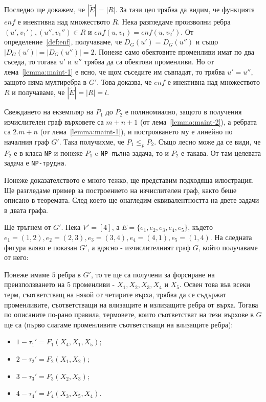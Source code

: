 \documentclass[12pt,twoside,a4paper]{article}
\begin{document}
\begin{theorem}
		Последно ще докажем, че $|\tilde{E}|=|R|$. За тази цел трябва да видим, че функцията $enf$ е инективна над множеството $R$. Нека разгледаме произволни ребра $(u',v_1'), (u'',v_1'') \in R$ и $enf(u,v_1)=enf(u,v_2')$. От определение~\ref{def:enf}, получаваме, че $D_G(u')=D_G(u'')$ и също $|D_G(u')|=|D_G(u'')|=2$. Понеже само обектовите променливи имат по два съседа, то тогава $u'$ и $u''$ трябва да са обектови променливи. Но от лема~\ref{lemma:maint-1} е ясно, че щом съседите им съвпадат, то трябва $u'=u''$, защото няма мултиребра в $G'$. Това доказва, че $enf$ е инективна над множеството $R$ и получаваме, че $|\tilde{E}|=|R|=l$.
		
		Свеждането на екземпляр на $P_1$ до $P_2$ е полиномиално, защото в получения изчислителен граф върховете са $m+n+1$ (от лема~\ref{lemma:maint-2}), а ребрата са $2.m+n$ (от лема~\ref{lemma:maint-1}), и построяването му е линейно по началния граф $G'$. Така получихме, че $P_1 \le_p P_2$. Също лесно може да се види, че $P_2$ е в класа \texttt{NP} и понеже $P_1$ e \texttt{NP-пълна} задача, то и $P_2$ е такава. От там целевата задача е \texttt{NP-трудна}.
	\end{theorem}
	
	\indent Понеже доказателството е много тежко, ще представим подходяща илюстрация. Ще разгледаме пример за построението на изчислителен граф, както беше описано в теоремата. След което ще онагледим еквивалентността на двете задачи в двата графа.
	
	Ще тръгнем от $G'$. Нека $V'=[4]$, а $E=\{e_1,e_2,e_3,e_4,e_5\}$, където $e_1=(1,2), e_2=(2,3), e_3=(3,4), e_4=(4,1), e_5=(1,4)$. На следната фигура вляво е показан $G'$, а вдясно - изчислителният граф $G$, който получаваме от него:
	\begin{center}
		\vspace{-0.2cm}
		
		
		\label{fig:two-graphs}
		\vspace{-0.2cm}
	\end{center}
	Понеже имаме $5$ ребра в $G'$, то те ще са получени за форсиране на преизползването на $5$ променливи - $X_1,X_2,X_3,X_4$ и $X_5$. Освен това във всеки терм, съответстващ на някой от четирите върха, трябва да се съдържат променливите, съответстващи на влизащите и излизащите ребра от върха. Тогава по описаните по-рано правила, термовете, които съответстват на тези върхове в $G$ ще са (първо слагаме променливите съответстващи на влизащите ребра):
	\begin{itemize}
		\item $1 - \tau_1'=F_1(X_4, X_1, X_5)$;
		\item $2 - \tau_2'=F_2(X_1, X_2)$;
		\item $3 - \tau_3'=F_3(X_2, X_3)$;
		\item $4 - \tau_4'=F_4(X_3, X_5, X_4)$.
	\end{itemize}
	
\end{document}
